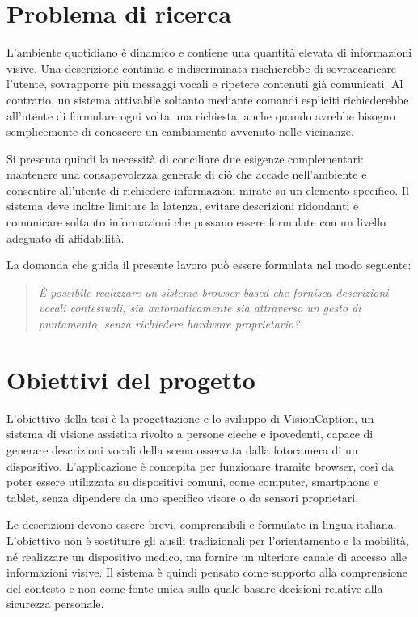 \section{Problema di ricerca}

L'ambiente quotidiano è dinamico e contiene una quantità elevata di
informazioni visive. Una descrizione continua e indiscriminata rischierebbe di
sovraccaricare l'utente, sovrapporre più messaggi vocali e ripetere contenuti
già comunicati. Al contrario, un sistema attivabile soltanto mediante comandi
espliciti richiederebbe all'utente di formulare ogni volta una richiesta,
anche quando avrebbe bisogno semplicemente di conoscere un cambiamento
avvenuto nelle vicinanze.

Si presenta quindi la necessità di conciliare due esigenze complementari:
mantenere una consapevolezza generale di ciò che accade nell'ambiente e
consentire all'utente di richiedere informazioni mirate su un elemento
specifico. Il sistema deve inoltre limitare la latenza, evitare descrizioni
ridondanti e comunicare soltanto informazioni che possano essere formulate con
un livello adeguato di affidabilità.

La domanda che guida il presente lavoro può essere formulata nel modo
seguente:

\begin{quote}
\emph{È possibile realizzare un sistema browser-based che fornisca
descrizioni vocali contestuali, sia automaticamente sia attraverso un gesto di
puntamento, senza richiedere hardware proprietario?}
\end{quote}

\section{Obiettivi del progetto}

L'obiettivo della tesi è la progettazione e lo sviluppo di VisionCaption, un
sistema di visione assistita rivolto a persone cieche e ipovedenti, capace di
generare descrizioni vocali della scena osservata dalla fotocamera di un
dispositivo. L'applicazione è concepita per funzionare tramite browser, così da
poter essere utilizzata su dispositivi comuni, come computer, smartphone e
tablet, senza dipendere da uno specifico visore o da sensori proprietari.

Le descrizioni devono essere brevi, comprensibili e formulate in lingua
italiana. L'obiettivo non è sostituire gli ausili tradizionali per
l'orientamento e la mobilità, né realizzare un dispositivo medico, ma fornire
un ulteriore canale di accesso alle informazioni visive. Il sistema è quindi
pensato come supporto alla comprensione del contesto e non come fonte unica
sulla quale basare decisioni relative alla sicurezza personale.

